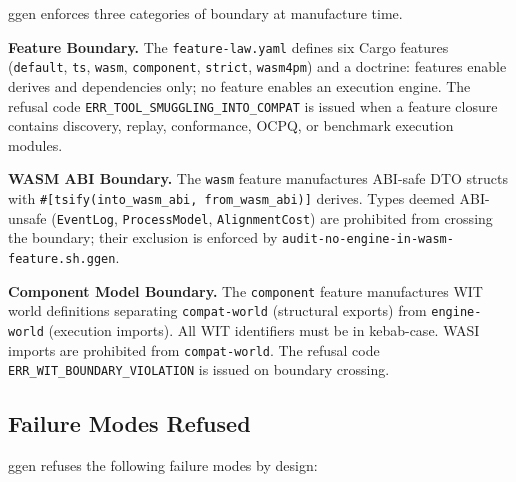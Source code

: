 ggen enforces three categories of boundary at manufacture time.

\textbf{Feature Boundary.} The \texttt{feature-law.yaml} defines six Cargo features
(\texttt{default}, \texttt{ts}, \texttt{wasm}, \texttt{component}, \texttt{strict},
\texttt{wasm4pm}) and a doctrine: features enable derives and dependencies only; no feature
enables an execution engine. The refusal code \texttt{ERR\_TOOL\_SMUGGLING\_INTO\_COMPAT} is
issued when a feature closure contains discovery, replay, conformance, OCPQ, or benchmark
execution modules.

\textbf{WASM ABI Boundary.} The \texttt{wasm} feature manufactures ABI-safe DTO structs with
\texttt{\#[tsify(into\_wasm\_abi, from\_wasm\_abi)]} derives. Types deemed ABI-unsafe
(\texttt{EventLog}, \texttt{ProcessModel}, \texttt{AlignmentCost}) are prohibited from crossing
the boundary; their exclusion is enforced by \texttt{audit-no-engine-in-wasm-feature.sh.ggen}.

\textbf{Component Model Boundary.} The \texttt{component} feature manufactures WIT world
definitions separating \texttt{compat-world} (structural exports) from \texttt{engine-world}
(execution imports). All WIT identifiers must be in kebab-case. WASI imports are prohibited from
\texttt{compat-world}. The refusal code \texttt{ERR\_WIT\_BOUNDARY\_VIOLATION} is issued on
boundary crossing.

\subsection{Failure Modes Refused}
\label{sec:ggen-architecture-failure-modes}

ggen refuses the following failure modes by design:

